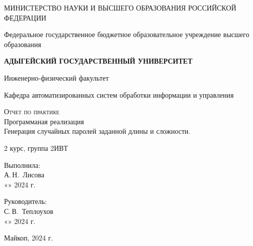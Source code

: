 \documentclass[12pt,a4paper]{scrartcl}
\begin{document}
	\begin{titlepage}
		\begin{center}
			\large
			МИНИСТЕРСТВО НАУКИ И ВЫСШЕГО ОБРАЗОВАНИЯ РОССИЙСКОЙ ФЕДЕРАЦИИ
			
			Федеральное государственное бюджетное образовательное учреждение высшего образования
			
			\textbf{АДЫГЕЙСКИЙ ГОСУДАРСТВЕННЫЙ УНИВЕРСИТЕТ}
			\vspace{0.25cm}
			
			Инженерно-физический факультет
			
			Кафедра автоматизированных систем обработки информации и управления
			\vfill

			\vfill
			
			\textsc{Отчет по практике}\\[5mm]
			
			{\LARGE Программаная реализация \\\LARGE{ Генерация случайных паролей заданной
длины и сложности.}}
			\bigskip
			
			2 курс, группа 2ИВТ 
		\end{center}
		\vfill
		
		\newlength{\ML}
		\hfill\begin{minipage}{0.5\textwidth}
			Выполнила:\\
			\underline{\hspace{\ML}} А.\,Н.~Лисова\\
			«\underline{\hspace{0.7cm}}» \underline{\hspace{2cm}} 2024 г.
		\end{minipage}%
		\bigskip
		
		\hfill\begin{minipage}{0.5\textwidth}
			Руководитель:\\
			\underline{\hspace{\ML}} С.\,В.~Теплоухов\\
			«\underline{\hspace{0.7cm}}» \underline{\hspace{2cm}} 2024 г.
		\end{minipage}%
		\vfill
		
		\begin{center}
			Майкоп, 2024 г.
		\end{center}
	\end{titlepage}
	
\end{document}
